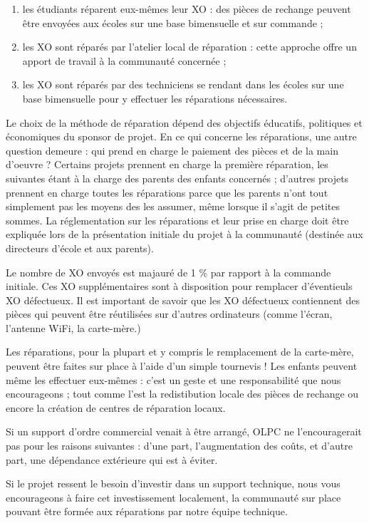 \documentclass[11pt]{article}
\begin{document}
\begin{enumerate}
\item les étudiants réparent eux-mêmes leur XO : des pièces de rechange
   peuvent être envoyées aux écoles sur une base bimensuelle et sur
   commande ;
\item les XO sont réparés par l'atelier local de réparation : cette approche
   offre un apport de travail à la communauté concernée ;
\item les XO sont réparés par des techniciens se rendant dans les écoles sur
   une base bimensuelle pour y effectuer les réparations nécessaires.
\end{enumerate}

Le choix de la méthode de réparation dépend des objectifs éducatifs,
politiques et économiques du sponsor de projet. En ce qui concerne les
réparations, une autre question demeure : qui prend en charge le paiement
des pièces et de la main d'oeuvre ? Certains projets prennent en charge la
première réparation, les suivantes étant à la charge des parents des
enfants concernés ; d'autres projets prennent en charge toutes les
réparations parce que les parents n'ont tout simplement pas les moyens des
les assumer, même lorsque il s'agit de petites sommes. La réglementation
sur les réparations et leur prise en charge doit être expliquée lors de la
présentation initiale du projet à la communauté (destinée aux directeurs
d'école et aux parents).

Le nombre de XO envoyés est majauré de 1 \% par rapport à la commande
initiale. Ces XO supplémentaires sont à disposition pour remplacer
d'éventieuls XO défectueux. Il est important de savoir que les XO
défectueux contiennent des pièces qui peuvent être réutilisées sur d'autres
ordinateurs (comme l'écran, l'antenne WiFi, la carte-mère.)

Les réparations, pour la plupart et y compris le remplacement de la
carte-mère, peuvent être faites sur place à l'aide d'un simple tournevis !
Les enfants peuvent même les effectuer eux-mêmes : c'est un geste et une
responsabilité que nous encourageons ; tout comme l'est la redistibution
locale des pièces de rechange ou encore la création de centres de
réparation locaux.

Si un support d'ordre commercial venait à être arrangé, OLPC ne
l'encouragerait pas pour les raisons suivantes : d'une part, l'augmentation
des coûts, et d'autre part, une dépendance extérieure qui est à éviter.

Si le projet ressent le besoin d'investir dans un support technique, nous
vous encourageons à faire cet investissement localement, la communauté sur
place pouvant être formée aux réparations par notre équipe technique.
\end{document}

